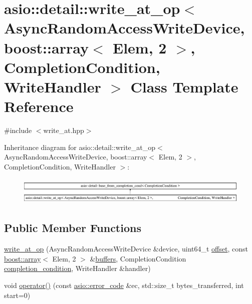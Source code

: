 \hypertarget{classasio_1_1detail_1_1write__at__op_3_01_async_random_access_write_device_00_01boost_1_1array_3e439bc739a816bec12c3cd7d54fe10a0}{}\section{asio\+:\+:detail\+:\+:write\+\_\+at\+\_\+op$<$ Async\+Random\+Access\+Write\+Device, boost\+:\+:array$<$ Elem, 2 $>$, Completion\+Condition, Write\+Handler $>$ Class Template Reference}
\label{classasio_1_1detail_1_1write__at__op_3_01_async_random_access_write_device_00_01boost_1_1array_3e439bc739a816bec12c3cd7d54fe10a0}


{\ttfamily \#include $<$write\+\_\+at.\+hpp$>$}

Inheritance diagram for asio\+:\+:detail\+:\+:write\+\_\+at\+\_\+op$<$ Async\+Random\+Access\+Write\+Device, boost\+:\+:array$<$ Elem, 2 $>$, Completion\+Condition, Write\+Handler $>$\+:\begin{figure}[H]
\begin{center}
\leavevmode
\includegraphics[height=1.323877cm]{classasio_1_1detail_1_1write__at__op_3_01_async_random_access_write_device_00_01boost_1_1array_3e439bc739a816bec12c3cd7d54fe10a0}
\end{center}
\end{figure}
\subsection*{Public Member Functions}
\begin{DoxyCompactItemize}
\item 
\hyperlink{classasio_1_1detail_1_1write__at__op_3_01_async_random_access_write_device_00_01boost_1_1array_3e439bc739a816bec12c3cd7d54fe10a0_a6ecc1a9d52efc62e6bb565ee23cea8fe}{write\+\_\+at\+\_\+op} (Async\+Random\+Access\+Write\+Device \&device, uint64\+\_\+t \hyperlink{group__async__read__at_ga8dcdb41a4adfd6fe5322b5dd666d9f29}{offset}, const \hyperlink{classboost_1_1array}{boost\+::array}$<$ Elem, 2 $>$ \&\hyperlink{group__async__read_ga54dede45c3175148a77fe6635222c47d}{buffers}, Completion\+Condition \hyperlink{group__async__read_gae2e215d5013596cc2b385bb6c13fa518}{completion\+\_\+condition}, Write\+Handler \&handler)
\item 
void \hyperlink{classasio_1_1detail_1_1write__at__op_3_01_async_random_access_write_device_00_01boost_1_1array_3e439bc739a816bec12c3cd7d54fe10a0_ade057c25b25c3b84b926d2cd264795f7}{operator()} (const \hyperlink{classasio_1_1error__code}{asio\+::error\+\_\+code} \&ec, std\+::size\+\_\+t bytes\+\_\+transferred, int start=0)
\end{DoxyCompactItemize}
